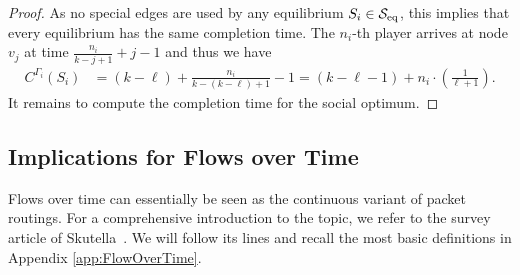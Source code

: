 \begin{proof}
As no special edges are used by any equilibrium $S_i\in\mathcal{S}_{\operatorname{eq}}$, this implies that every equilibrium has the same completion time. The $n_i$-th player arrives at node $v_j$ at time $\frac{n_i}{k-j+1}+ j-1$ and thus we have
\begin{align}
    C^{\Gamma_i}(S_i) &= (k-\ell) + \frac{n_i}{k- (k-\ell)+1} -1 = (k-\ell -1) + n_i\cdot \left(\frac{1}{\ell+1}\right).\label{eq:nash}
\end{align}
%
It remains to compute the completion time for the social optimum. 

\end{proof}

\subsection{Implications for Flows over Time}\label{sec:FlowOverTime}
Flows over time can essentially be seen as the continuous variant of packet routings. For a comprehensive introduction to the topic, we refer to the survey article of Skutella~\cite{Skutella2009survey}. 
We will follow its lines and recall the most basic definitions in Appendix \ref{app:FlowOverTime}.



